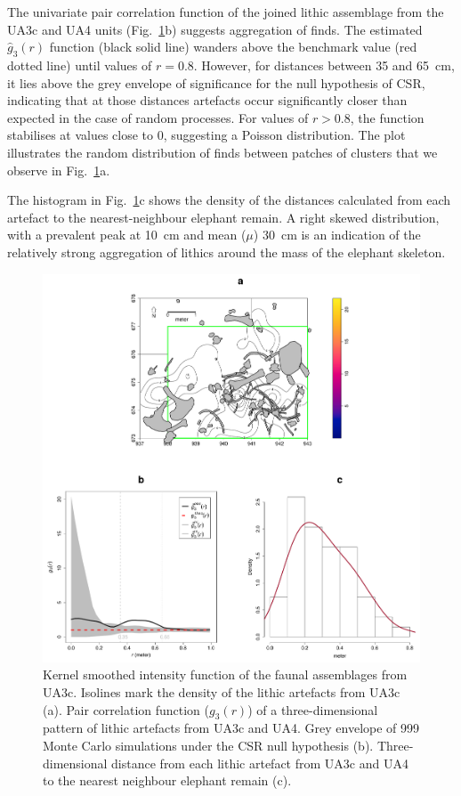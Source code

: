 \documentclass[preprint,authoryear,times]{elsarticle} %
\begin{document}
The univariate pair correlation function of the joined lithic assemblage from the UA3c and UA4 units (Fig.~\ref{fig:11}b) suggests aggregation of finds. The estimated $\hat{g}_3(r)$ function (black solid line) wanders above the benchmark value (red dotted line) until values of $r=0.8$. However, for distances between 35 and 65~cm, it lies above the grey envelope of significance for the null hypothesis of CSR, indicating that at those distances artefacts occur significantly closer than expected in the case of random processes. For values of $r>0.8$, the function stabilises at values close to 0, suggesting a Poisson distribution. The plot illustrates the random distribution of finds between patches of clusters that we observe in Fig.~\ref{fig:11}a.

The histogram in Fig.~\ref{fig:11}c shows the density of the distances calculated from each artefact to the nearest-neighbour elephant remain. A right skewed distribution, with a prevalent peak at 10~cm and mean ($\mu$) 30~cm is an indication of the relatively strong aggregation of lithics around the mass of the elephant skeleton.

\begin{figure}[]
  \centering
  \includegraphics[width=1\textwidth]{./artwork/Fig11.pdf}
  \caption{Kernel smoothed intensity function of the faunal assemblages from UA3c. Isolines mark the density of the lithic artefacts from UA3c (a). Pair correlation function ($g_3(r)$) of a three-dimensional pattern of lithic artefacts from UA3c and UA4. Grey envelope of 999 Monte Carlo simulations under the CSR null hypothesis (b). Three-dimensional distance from each lithic artefact from UA3c and UA4 to the nearest neighbour elephant remain (c).}
  \label{fig:11}
\end{figure}
\end{document}
